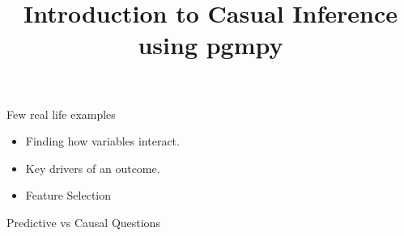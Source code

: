 \documentclass{beamer}
\begin{document}
\title[]{Introduction to Casual Inference using pgmpy}
\date{}

\maketitle

\begin{frame}{Few real life examples}
	\begin{itemize}
		\item Finding how variables interact.
		\item Key drivers of an outcome.
		\item Feature Selection
	\end{itemize}
\end{frame}

\begin{frame}{Predictive vs Causal Questions}
\end{frame}
\end{document}
